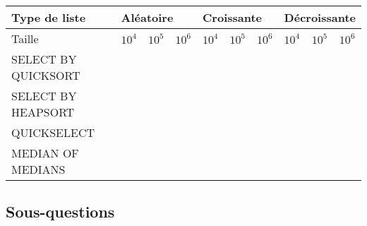 \documentclass[a4paper, 10pt, oneside]{article}
\begin{document}
\begin{table}[!h]
\begin{tabular}{|l|lllllllll|}
\hline
Type de liste       & \multicolumn{3}{l}{Aléatoire}                                                              & \multicolumn{3}{l}{Croissante}                                        & \multicolumn{3}{l|}{Décroissante}                                     \\ \hline
Taille              & \multicolumn{1}{l|}{$10^4$} & $10^5$ & $10^6$ & $10^4$ & $10^5$ & $10^6$ & $10^4$ & $10^5$ & $10^6$ \\ \hline
SELECT BY QUICKSORT & \multicolumn{1}{l|}{}                      & \multicolumn{1}{l|}{} & \multicolumn{1}{l|}{} & \multicolumn{1}{l|}{} & \multicolumn{1}{l|}{} & \multicolumn{1}{l|}{} & \multicolumn{1}{l|}{} & \multicolumn{1}{l|}{} &                       \\
SELECT BY HEAPSORT  & \multicolumn{1}{l|}{}                      & \multicolumn{1}{l|}{} & \multicolumn{1}{l|}{} & \multicolumn{1}{l|}{} & \multicolumn{1}{l|}{} & \multicolumn{1}{l|}{} & \multicolumn{1}{l|}{} & \multicolumn{1}{l|}{} &                       \\
QUICKSELECT         & \multicolumn{1}{l|}{}                      & \multicolumn{1}{l|}{} & \multicolumn{1}{l|}{} & \multicolumn{1}{l|}{} & \multicolumn{1}{l|}{} & \multicolumn{1}{l|}{} & \multicolumn{1}{l|}{} & \multicolumn{1}{l|}{} &                       \\
MEDIAN OF MEDIANS   & \multicolumn{1}{l|}{}                      & \multicolumn{1}{l|}{} & \multicolumn{1}{l|}{} & \multicolumn{1}{l|}{} & \multicolumn{1}{l|}{} & \multicolumn{1}{l|}{} & \multicolumn{1}{l|}{} & \multicolumn{1}{l|}{} &                       \\ \hline
\end{tabular}
\end{table}

\subsection{Sous-questions}
\end{document}
